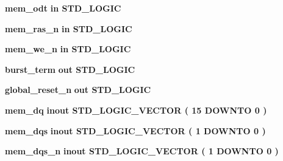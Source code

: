 \begin{DoxyCompactItemize}
\item 
{\bf mem\+\_\+odt}  {\bfseries {\bfseries \textcolor{keywordflow}{in}\textcolor{vhdlchar}{ }}} {\bfseries \textcolor{comment}{S\+T\+D\+\_\+\+L\+O\+G\+IC}\textcolor{vhdlchar}{ }} 
\item 
{\bf mem\+\_\+ras\+\_\+n}  {\bfseries {\bfseries \textcolor{keywordflow}{in}\textcolor{vhdlchar}{ }}} {\bfseries \textcolor{comment}{S\+T\+D\+\_\+\+L\+O\+G\+IC}\textcolor{vhdlchar}{ }} 
\item 
{\bf mem\+\_\+we\+\_\+n}  {\bfseries {\bfseries \textcolor{keywordflow}{in}\textcolor{vhdlchar}{ }}} {\bfseries \textcolor{comment}{S\+T\+D\+\_\+\+L\+O\+G\+IC}\textcolor{vhdlchar}{ }} 
\item 
{\bf burst\+\_\+term}  {\bfseries {\bfseries \textcolor{keywordflow}{out}\textcolor{vhdlchar}{ }}} {\bfseries \textcolor{comment}{S\+T\+D\+\_\+\+L\+O\+G\+IC}\textcolor{vhdlchar}{ }} 
\item 
{\bf global\+\_\+reset\+\_\+n}  {\bfseries {\bfseries \textcolor{keywordflow}{out}\textcolor{vhdlchar}{ }}} {\bfseries \textcolor{comment}{S\+T\+D\+\_\+\+L\+O\+G\+IC}\textcolor{vhdlchar}{ }} 
\item 
{\bf mem\+\_\+dq}  {\bfseries {\bfseries \textcolor{keywordflow}{inout}\textcolor{vhdlchar}{ }}} {\bfseries \textcolor{comment}{S\+T\+D\+\_\+\+L\+O\+G\+I\+C\+\_\+\+V\+E\+C\+T\+OR}\textcolor{vhdlchar}{ }\textcolor{vhdlchar}{(}\textcolor{vhdlchar}{ }\textcolor{vhdlchar}{ } \textcolor{vhdldigit}{15} \textcolor{vhdlchar}{ }\textcolor{keywordflow}{D\+O\+W\+N\+TO}\textcolor{vhdlchar}{ }\textcolor{vhdlchar}{ } \textcolor{vhdldigit}{0} \textcolor{vhdlchar}{ }\textcolor{vhdlchar}{)}\textcolor{vhdlchar}{ }} 
\item 
{\bf mem\+\_\+dqs}  {\bfseries {\bfseries \textcolor{keywordflow}{inout}\textcolor{vhdlchar}{ }}} {\bfseries \textcolor{comment}{S\+T\+D\+\_\+\+L\+O\+G\+I\+C\+\_\+\+V\+E\+C\+T\+OR}\textcolor{vhdlchar}{ }\textcolor{vhdlchar}{(}\textcolor{vhdlchar}{ }\textcolor{vhdlchar}{ } \textcolor{vhdldigit}{1} \textcolor{vhdlchar}{ }\textcolor{keywordflow}{D\+O\+W\+N\+TO}\textcolor{vhdlchar}{ }\textcolor{vhdlchar}{ } \textcolor{vhdldigit}{0} \textcolor{vhdlchar}{ }\textcolor{vhdlchar}{)}\textcolor{vhdlchar}{ }} 
\item 
{\bf mem\+\_\+dqs\+\_\+n}  {\bfseries {\bfseries \textcolor{keywordflow}{inout}\textcolor{vhdlchar}{ }}} {\bfseries \textcolor{comment}{S\+T\+D\+\_\+\+L\+O\+G\+I\+C\+\_\+\+V\+E\+C\+T\+OR}\textcolor{vhdlchar}{ }\textcolor{vhdlchar}{(}\textcolor{vhdlchar}{ }\textcolor{vhdlchar}{ } \textcolor{vhdldigit}{1} \textcolor{vhdlchar}{ }\textcolor{keywordflow}{D\+O\+W\+N\+TO}\textcolor{vhdlchar}{ }\textcolor{vhdlchar}{ } \textcolor{vhdldigit}{0} \textcolor{vhdlchar}{ }\textcolor{vhdlchar}{)}\textcolor{vhdlchar}{ }} 
\end{DoxyCompactItemize}


